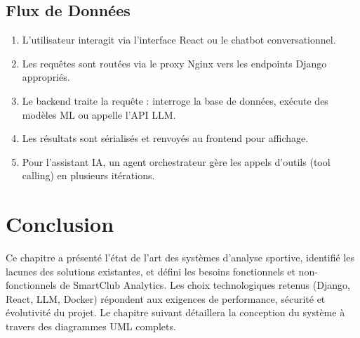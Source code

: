 \subsection{Flux de Données}

\begin{enumerate}
    \item L'utilisateur interagit via l'interface React ou le chatbot conversationnel.
    \item Les requêtes sont routées via le proxy Nginx vers les endpoints Django appropriés.
    \item Le backend traite la requête : interroge la base de données, exécute des modèles ML ou appelle l'API LLM.
    \item Les résultats sont sérialisés et renvoyés au frontend pour affichage.
    \item Pour l'assistant IA, un agent orchestrateur gère les appels d'outils (tool calling) en plusieurs itérations.
\end{enumerate}

\section{Conclusion}

Ce chapitre a présenté l'état de l'art des systèmes d'analyse sportive, identifié les lacunes des solutions existantes, et défini les besoins fonctionnels et non-fonctionnels de SmartClub Analytics. Les choix technologiques retenus (Django, React, LLM, Docker) répondent aux exigences de performance, sécurité et évolutivité du projet. Le chapitre suivant détaillera la conception du système à travers des diagrammes UML complets.

